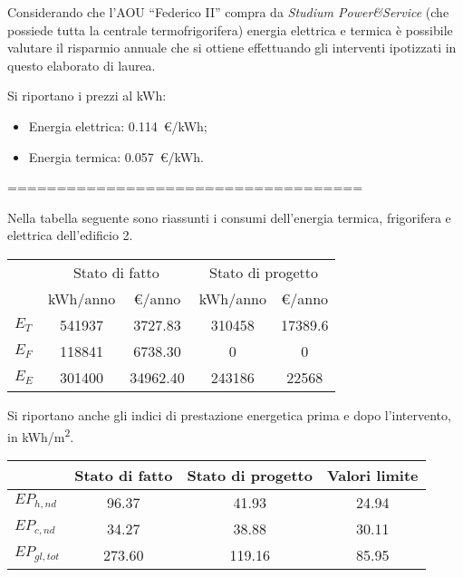 Considerando che l'AOU ``Federico II'' compra da \emph{Studium Power\&Service} (che possiede tutta la centrale termofrigorifera) energia elettrica e termica è possibile valutare il risparmio annuale che si ottiene effettuando gli interventi ipotizzati in questo elaborato di laurea.

Si riportano i prezzi al kWh: 
\begin{itemize}
	\item Energia elettrica: \num{0.114}\ \euro/kWh;
	\item Energia termica: \num{0.057}\ \euro/kWh.
\end{itemize}





====================================

Nella tabella seguente sono riassunti i consumi dell'energia termica, frigorifera e elettrica dell'edificio 2.
\begin{center}
	\begin{tabular}{lcccc}
		\toprule
		& \multicolumn{2}{c}{Stato di fatto} & \multicolumn{2}{c}{Stato di progetto}\\
		& \si{kWh/anno} & \euro/anno & \si{kWh/anno} & \euro/anno \\
		\midrule
		$E_T$ & \num{541937} & \num{3727.83} & \num{310458} & \num{17389.6} \\
		$E_F$ & \num{118841} & \num{6738.30}  & \num{0} 	& \num{0}\\
		$E_E$ & \num{301400} & \num{34962.40} &	\num{243186}& \num{22568}\\
		\bottomrule		
	\end{tabular}
\end{center}

Si riportano anche gli indici di prestazione energetica prima e dopo l'intervento, in \si{kWh/m^2}.
\begin{center}
	\begin{tabular}{lccc}
		\toprule
				& Stato di fatto & Stato di progetto & Valori limite \\
		\midrule
		$EP_{h,nd}$ & \num{96.37} & \num{41.93} & \num{24.94}\\
		$EP_{c,nd}$ & \num{34.27} & \num{38.88} & \num{30.11}\\
		$EP_{gl,tot}$ & \num{273.60} & \num{119.16} & \num{85.95}\\
		\bottomrule
	\end{tabular}
\end{center}

